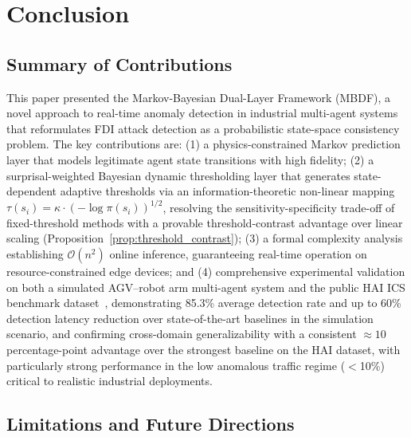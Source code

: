 \documentclass[manuscript,screen,review]{acmart}
\begin{document}
\section{Conclusion}
\label{sec:conclusion}

\subsection{Summary of Contributions}
\label{subsec:contributions_summary}

This paper presented the Markov-Bayesian Dual-Layer
Framework (MBDF), a novel approach to real-time anomaly
detection in industrial multi-agent systems that
reformulates FDI attack detection as a probabilistic
state-space consistency problem. The key contributions
are: (1) a physics-constrained Markov prediction layer
that models legitimate agent state transitions with
high fidelity; (2) a surprisal-weighted Bayesian dynamic
thresholding layer that generates state-dependent adaptive
thresholds via an information-theoretic non-linear mapping
$\tau(s_i) = \kappa \cdot (-\log \pi(s_i))^{1/2}$,
resolving the sensitivity-specificity trade-off of
fixed-threshold methods with a provable threshold-contrast
advantage over linear scaling
(Proposition~\ref{prop:threshold_contrast}); (3) a formal
complexity analysis establishing $\mathcal{O}(n^2)$ online
inference, guaranteeing real-time operation on
resource-constrained edge devices; and (4) comprehensive
experimental validation on both a simulated AGV--robot
arm multi-agent system and the public HAI ICS benchmark
dataset~\cite{ref_hai}, demonstrating 85.3\% average
detection rate and up to 60\% detection latency reduction
over state-of-the-art baselines in the simulation scenario,
and confirming cross-domain generalizability with a
consistent ${\approx}10$ percentage-point advantage over
the strongest baseline on the HAI dataset, with
particularly strong performance in the low anomalous
traffic regime ($<$10\%) critical to realistic
industrial deployments.

\subsection{Limitations and Future Directions}
\label{subsec:limitations}
\end{document}
